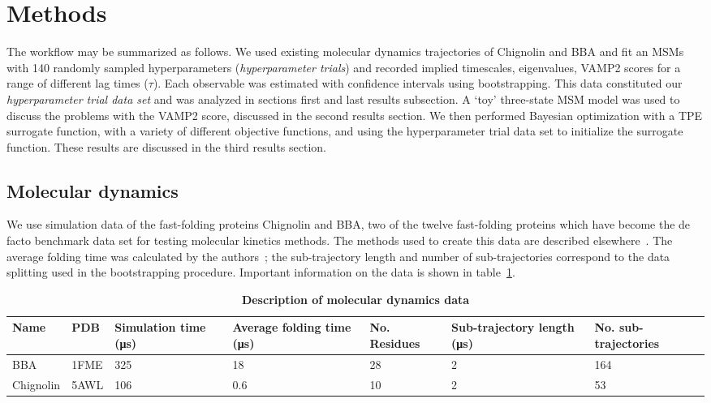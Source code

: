 \documentclass[journal=jacsat,manuscript=article]{achemso}
\begin{document}
\section{Methods}

The workflow may be summarized as follows.  We used existing molecular dynamics trajectories of Chignolin and BBA and fit an MSMs with 140 randomly sampled hyperparameters (\emph{hyperparameter trials}) and recorded implied timescales, eigenvalues, VAMP2 scores for a range of different lag times ($\tau$). Each observable was estimated with confidence intervals using bootstrapping. This data constituted our \emph{hyperparameter trial data set} and was analyzed in sections first and last results subsection. A `toy' three-state MSM model was used to discuss the problems with the VAMP2 score, discussed in the second results section. We then performed Bayesian optimization with a TPE surrogate function, with a variety of different objective functions, and using the hyperparameter trial data set to initialize the surrogate function. These results are discussed in the third results section. 


\subsection{Molecular dynamics}

We use simulation data of the fast-folding proteins Chignolin and BBA, two of the twelve fast-folding proteins which have become the de facto benchmark data set for testing molecular kinetics methods. The methods used to create this data are described elsewhere~\cite{lindorff-larsen_how_2011}. The average folding time was calculated by the authors~\cite{lindorff-larsen_how_2011}; the sub-trajectory length and number of sub-trajectories correspond to the data splitting used in the bootstrapping procedure. Important information on the data is shown in table~\ref{tab:data_description}. 

\begin{table}
    \caption{\textbf{Description of molecular dynamics data}}
    \begin{tabularx}{\textwidth}{llXXXXX}
    \toprule
    Name & PDB & Simulation time (\si{\micro\second}) & Average folding time (\si{\micro\second}) & No. Residues & Sub-trajectory length (\si{\micro\second}) & No. sub-trajectories \\
    \midrule
    BBA                 & 1FME      & \num{325}     & \num{18}  & 28 & \num{2} & 164 \\
    Chignolin           & 5AWL    & \num{106}     & \num{0.6}  & 10 & 2 & 53 \\ 
    \bottomrule
    \end{tabularx}
    \label{tab:data_description}
\end{table}
\end{document}
